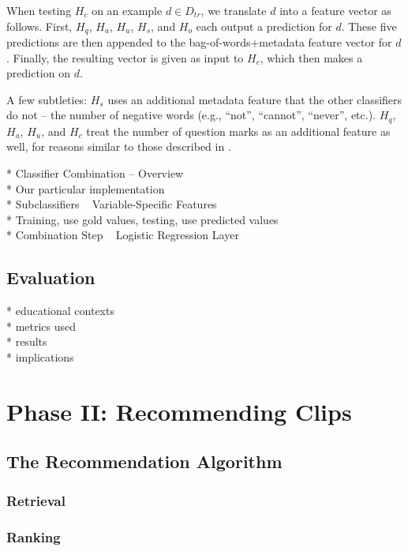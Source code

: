 \documentclass{edm_template}
\begin{document}
When testing $H_{c}$ on an example $d \in D_{tr}$, we translate $d$ into a feature vector as follows. First, $H_{q}$, $H_{a}$, $H_{u}$, $H_{s}$, and $H_{o}$ each output a prediction for $d$. These five predictions are then appended to the bag-of-words+metadata feature vector for $d$. Finally, the resulting vector is given as input to $H_{c}$, which then makes a prediction on $d$.

A few subtleties: $H_{s}$ uses an additional metadata feature that the other classifiers do not -- the number of negative words (e.g., ``not'', ``cannot'', ``never'', etc.). $H_{q}$, $H_{a}$, $H_{u}$, and $H_{c}$ treat the number of question marks as an additional feature as well, for reasons similar to those described in \cite{wen2015confusion}.

* Classifier Combination -- Overview \\
* Our particular implementation \\
* Subclassifiers ~ Variable-Specific Features \\
* Training, use gold values, testing, use predicted values \\
* Combination Step ~ Logistic Regression Layer \\

\subsection{Evaluation}

* educational contexts \\
* metrics used \\ 
* results \\
* implications \\

\section{Phase II: Recommending Clips}
\subsection{The Recommendation Algorithm}
\subsubsection{Retrieval}
\subsubsection{Ranking}
\end{document}

